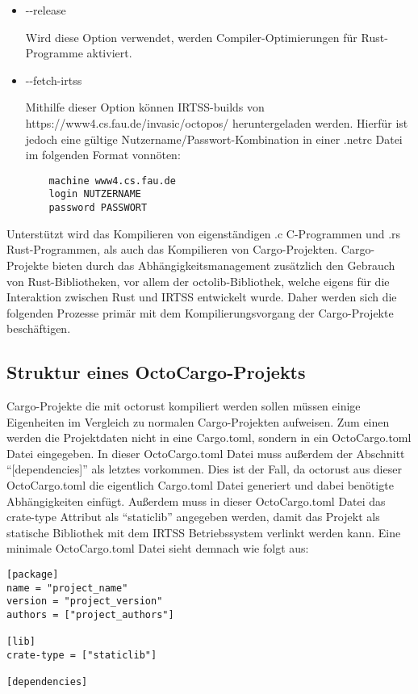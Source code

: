 \begin{itemize}
	\item{-{}-release}

	Wird diese Option verwendet, werden Compiler-Optimierungen für Rust-Programme aktiviert.
	
	\item{-{}-fetch-irtss}

	Mithilfe dieser Option können IRTSS-builds von https://www4.cs.fau.de/invasic/octopos/ heruntergeladen werden. Hierfür ist jedoch
	eine gültige Nutzername/Passwort-Kombination in einer .netrc Datei im folgenden Format vonnöten:
	\begin{verbatim}
	machine www4.cs.fau.de
	login NUTZERNAME
	password PASSWORT
	\end{verbatim}
\end{itemize}

Unterstützt wird das Kompilieren von eigenständigen .c C-Programmen und .rs Rust-Programmen, als auch das Kompilieren von
Cargo-Projekten. Cargo-Projekte bieten durch das Abhängigkeitsmanagement zusätzlich den Gebrauch von Rust-Bibliotheken, vor
allem der octolib-Bibliothek, welche eigens für die Interaktion zwischen Rust und IRTSS entwickelt wurde. Daher werden sich die
folgenden Prozesse primär mit dem Kompilierungsvorgang der Cargo-Projekte beschäftigen.

\subsection{Struktur eines OctoCargo-Projekts}

Cargo-Projekte die mit octorust kompiliert werden sollen müssen einige Eigenheiten im Vergleich zu normalen Cargo-Projekten aufweisen.
Zum einen werden die Projektdaten nicht in eine Cargo.toml, sondern in ein OctoCargo.toml Datei eingegeben. In dieser OctoCargo.toml
Datei muss außerdem der Abschnitt ``[dependencies]'' als letztes vorkommen. 
Dies ist der Fall, da octorust aus dieser OctoCargo.toml die eigentlich Cargo.toml Datei generiert
und dabei benötigte Abhängigkeiten einfügt. Außerdem muss in dieser OctoCargo.toml Datei das crate-type Attribut als
``staticlib'' angegeben werden, damit das Projekt als statische Bibliothek mit dem IRTSS Betriebssystem verlinkt werden kann.
Eine minimale OctoCargo.toml Datei sieht demnach wie folgt aus:
\begin{verbatim}
[package]
name = "project_name"
version = "project_version"
authors = ["project_authors"]

[lib]
crate-type = ["staticlib"]

[dependencies]
\end{verbatim}

